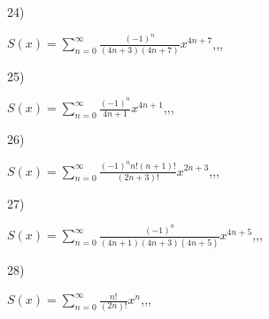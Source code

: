 \documentclass[11pt, ukrainian]{article}
\begin{document}
\par
\vspace{0.9cm}
24) \space 
{%
{$S(x)=\sum\limits_{n=0}^{\infty}{\frac{(-1)^n}{(4n+3)(4n+7)}}{x^{{4n+7}}}$},,, \par \smallskip  
}
\par
\newpage
25) \space 
{%
{$S(x)=\sum\limits_{n=0}^{\infty}{\frac{(-1)^n}{4n+1}}{x^{{4n+1}}}$},,, \par \smallskip  
}
\par
\vspace{0.9cm}
26) \space 
{%
{$S(x)=\sum\limits_{n=0}^{\infty}{\frac{{(-1)^n}n!(n+1)!}{(2n+3)!}}{x^{{2n+3}}}$},,, \par \smallskip  
}
\par
\vspace{0.9cm}
27) \space 
{%
{$S(x)=\sum\limits_{n=0}^{\infty}{\frac{(-1)^n}{(4n+1)(4n+3)(4n+5)}}{x^{{4n+5}}}$},,, \par \smallskip  
}
\par
\vspace{0.9cm}
28) \space 
{%
{$S(x)=\sum\limits_{n=0}^{\infty}{\frac{n!}{(2n)!}}{x^{{n}}}$},,, \par \smallskip  
}
\par
\end{document}
